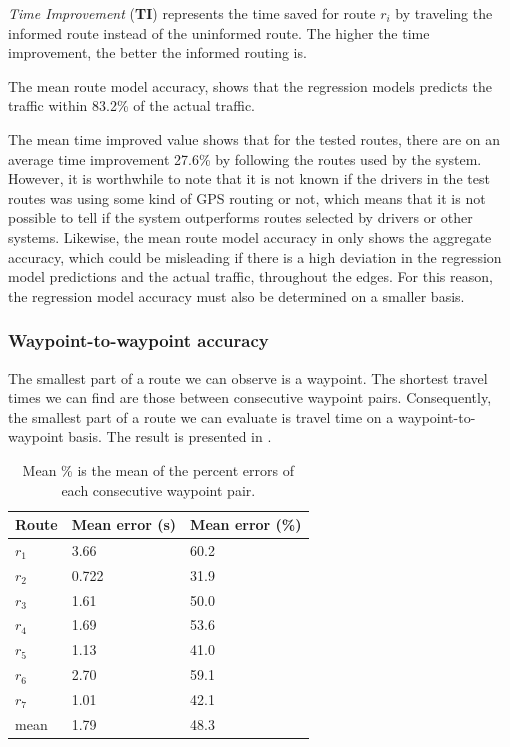 \emph{Time Improvement} (\textbf{TI}) represents the time saved for route $r_i$ by traveling the informed route instead of the uninformed route. The higher the time improvement, the better the informed routing is.

The mean route model accuracy, shows that the regression models predicts the traffic within 83.2\% of the actual traffic. 

The mean time improved value shows that for the tested routes, there are on an average time improvement 27.6\% by following the routes used by the system. However, it is worthwhile to note that it is not known if the drivers in the test routes was using some kind of GPS routing or not, which means that it is not possible to tell if the system outperforms routes selected by drivers or other systems. Likewise, the mean route model accuracy in  only shows the aggregate accuracy, which could be misleading if there is a high deviation in the regression model predictions and the actual traffic, throughout the edges. For this reason, the regression model accuracy must also be determined on a smaller basis.

\subsubsection{Waypoint-to-waypoint accuracy}
The smallest part of a route we can observe is a waypoint. The shortest travel times we can find are those between consecutive waypoint pairs. Consequently, the smallest part of a route we can evaluate is travel time on a waypoint-to-waypoint basis. The result is presented in .

\begin{table}[H]
	\centering
	\begin{tabular}{lll}
		\textbf{Route} & \textbf{Mean error (s)}                          & \textbf{Mean error (\%)} \\ \hline
		$r_1$          & 3.66                                             & 60.2 \\
		$r_2$          & 0.722                                            & 31.9 \\
		$r_3$          & 1.61                                             & 50.0 \\
		$r_4$          & 1.69                                             & 53.6 \\
		$r_5$          & 1.13                                             & 41.0 \\
		$r_6$          & 2.70                                             & 59.1 \\
		$r_7$          & 1.01                                             & 42.1 \\ \hline
		mean           & 1.79                                             & 48.3
	\end{tabular}
	\caption{Mean \% is the mean of the percent errors of each consecutive waypoint pair.}
	\label{tab:eval-results-2}
\end{table}

